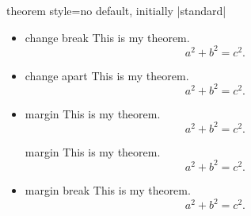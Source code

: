 \begin{docTcbKey}{theorem style}{=}{no default, initially |standard|}
\begin{itemize}
\begin{dispExample}
\begin{theorem}[theorem style=change]{change}{}
This is my theorem. \begin{equation*} a^2 + b^2 = c^2. \end{equation*}
\end{theorem}
\end{dispExample}
%
\item{}
\begin{dispExample}
\begin{theorem}[theorem style=change break]{change break}{}
This is my theorem. \begin{equation*} a^2 + b^2 = c^2. \end{equation*}
\end{theorem}
\end{dispExample}
%
\item{}
\begin{dispExample}
\begin{theorem}[theorem style=change apart]{change apart}{}
This is my theorem. \begin{equation*} a^2 + b^2 = c^2. \end{equation*}
\end{theorem}
\end{dispExample}
%
\item{}
\begin{dispExample}
\begin{theorem}[theorem style=margin,left=10mm]{margin}{}
This is my theorem. \begin{equation*} a^2 + b^2 = c^2. \end{equation*}
\end{theorem}
\begin{theorem}[theorem style=margin,left=10mm,oversize]{margin}{}
This is my theorem. \begin{equation*} a^2 + b^2 = c^2. \end{equation*}
\end{theorem}
\end{dispExample}
%
\item{}
\begin{dispExample}
\begin{theorem}[theorem style=margin break,left=10mm]{margin break}{}
This is my theorem. \begin{equation*} a^2 + b^2 = c^2. \end{equation*}

\end{theorem}
\end{dispExample}
\end{itemize}
\end{docTcbKey}
